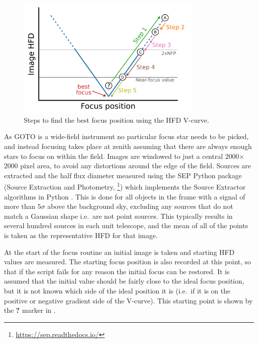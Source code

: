 \begin{colsection}
\begin{colsection}
\begin{figure}[t]
    \begin{center}
        \includegraphics[width=0.8\textwidth]{images/autofocus.pdf}
    \end{center}
    \caption[Steps to find the best focus position using the HFD V-curve]{
        Steps to find the best focus position using the HFD V-curve.
    }\label{fig:autofocus}
\end{figure}

As GOTO is a wide-field instrument no particular focus star needs to be picked, and instead focusing takes place at zenith assuming that there are always enough stars to focus on within the field. Images are windowed to just a central 2000$\times$2000 pixel area, to avoid any distortions around the edge of the field. Sources are extracted and the half flux diameter measured using the SEP Python package (Source Extraction and Photometry, \footnote{\url{https://sep.readthedocs.io/}}) which implements the Source Extractor algorithms in Python \citep{SE}. This is done for all objects in the frame with a signal of more than $5\sigma$ above the background sky, excluding any sources that do not match a Gaussian shape i.e.\ are not point sources. This typically results in several hundred sources in each unit telescope, and the mean of all of the points is taken as the representative HFD for that image.

At the start of the focus routine an initial image is taken and starting HFD values are measured. The starting focus position is also recorded at this point, so that if the script fails for any reason the initial focus can be restored. It is assumed that the initial value should be fairly close to the ideal focus position, but it is not known which side of the ideal position it is (i.e.\ if it is on the positive or negative gradient side of the V-curve). This starting point is shown by the \textbf{?} marker in .


\end{colsection}
\end{colsection}
